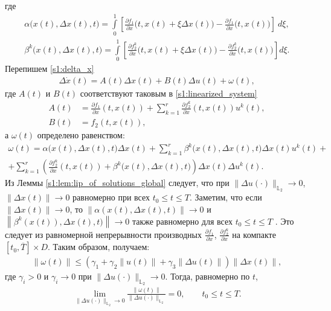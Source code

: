\documentclass[../main.tex]{subfiles}
\begin{document}
где
\begin{gather*}
	\alpha\Big(x(t),\Delta x(t), t\Big) = 
	\int\limits_0^1 \left[ \frac{\partial f_1}{\partial x} \Big(t, x(t) + \xi \Delta x(t)\Big) - \frac{\partial f_1}{\partial x} \Big(t, x(t)\Big) \right] \ d\xi,\\
	\beta^k\Big(x(t),\Delta x(t), t\Big) = \int\limits_0^1 \left[ \frac{\partial f_2^k}{\partial x} \Big(t, x(t) + \xi \Delta x(t)\Big) - \frac{\partial f_2^k}{\partial x} \Big(t, x(t)\Big) \right] d\xi.
\end{gather*}
Перепишем \eqref{s1:delta_x}
\begin{gather*}
	\Delta \dot{x}(t) =
	A(t) \Delta x(t) +
	B(t) \Delta u(t) +
	\omega(t),
\end{gather*}
где $A(t)$ и $B(t)$ соответствуют таковым в \eqref{s1:linearized_system}
\begin{align*}
	A(t) &= \frac{\partial f_1}{\partial x}(t,x(t)) + \sum\limits_{k=1}^r \frac{\partial f_2^k}{\partial x}(t,x(t)) u^k(t), \\
	B(t) &= f_2(t,x(t)),
\end{align*}
а $\omega(t)$ определено равенством:
\begin{gather*}
		\omega(t) = 
		\alpha\Big(x(t),\Delta x(t), t\Big)\Delta x(t) 
		+
		\sum\limits_{k=1}^r 
		\beta^k\Big(x(t),\Delta x(t), t\Big)\Delta x(t) u^k(t) 
		+ \\ + 
		\sum\limits_{k=1}^r 
		\left(
		 \frac{\partial f_2^k}{\partial x}(t,x(t)) + \beta^k\Big(x(t),\Delta x(t), t\Big)
		\right) 
		\Delta x(t) \Delta u^k(t).
\end{gather*}
Из Леммы \ref{s1:lem:lip_of_solutions_global} следует, что при $\|\Delta u(\cdot)\|_{\mathbb{L}_2} \to 0$, $\|\Delta x(t)\| \to 0$ равномерно при всех $t_0 \leqslant t \leqslant T$.
Заметим, что если $\|\Delta x(t)\| \to 0$, то $ \left\| \alpha(x(t),\Delta x(t), t) \right\| \to 0 $ и $ \left\| \beta^k(x(t)),\Delta x(t), t) \right\| \to 0 $ также равномерно для всех $ t_0 \leqslant t \leqslant T $ .
Это следует из равномерной непрерывности производных $\frac{\partial f_1}{\partial x}$, $\frac{\partial f_2^k}{\partial x}$ на компакте $[t_0, \overline{T}] \times D$.
Таким образом, получаем:
\begin{gather*}
	\|\omega(t)\| \leqslant \left( \gamma_1 + \gamma_2 \|u(t)\| + \gamma_3 \|\Delta u(t)\| \right) \|\Delta x(t)\|,
\end{gather*}
где $\gamma_i > 0 $ и $\gamma_i \to 0 $ при $ \|\Delta u(\cdot)\|_{\mathbb{L}_2} ​\to 0$.
Тогда, равномерно по $t$,
\begin{gather}\label{s1:lim_omega}
	\lim\limits_{\|\Delta u(\cdot) \|_{\mathbb{L}_2} \to 0} \frac{ \| \omega(t) \| }{\|\Delta u(\cdot) \|_{\mathbb{L}_2}} = 0, \qquad t_0 \leqslant t \leqslant T .
\end{gather}
\end{document}
